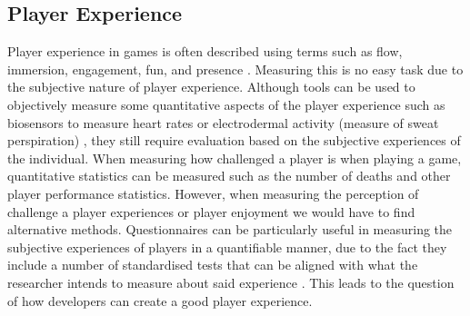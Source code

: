 \documentclass[journal]{IEEEtran}
\begin{document}
\subsection{Player Experience}
Player experience in games is often described using terms such as flow, immersion, engagement, fun, and presence \cite{isbister2008game} \cite{czikszentmihalyi1990flow} \cite{mcmahan2013immersion}. Measuring this is no easy task due to the subjective nature of player experience. Although tools can be used to objectively measure some quantitative aspects of the player experience such as biosensors to measure heart rates or electrodermal activity (measure of sweat perspiration)\cite{mikami2017adaptable} \cite{ambinder2011biofeedback} \cite{liu2009dynamic}, they still require evaluation based on the subjective experiences of the individual. When measuring how challenged a player is when playing a game, quantitative statistics can be measured such as the number of deaths and other player performance statistics. However, when measuring the perception of challenge a player experiences or player enjoyment we would have to find alternative methods. Questionnaires can be particularly useful in measuring the subjective experiences of players in a quantifiable manner, due to the fact they include a number of standardised tests that can be aligned with what the researcher intends to measure about said experience \cite{ijsselsteijn2013game}. This leads to the question of how developers can create a good player experience.
\end{document}
